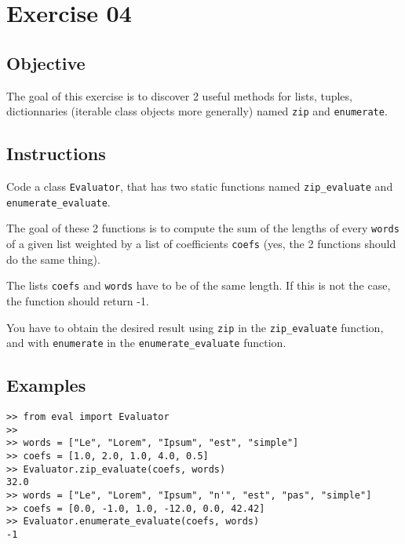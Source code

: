 \chapter{Exercise 04}
\makeheaderfilesforbidden


\section*{Objective}
The goal of this exercise is to discover 2 useful methods for lists, tuples,
dictionnaries (iterable class objects more generally) named \texttt{zip}
and \texttt{enumerate}.

\section*{Instructions}
Code a class \texttt{Evaluator}, that has two static functions named \texttt{zip\_evaluate}
and \texttt{enumerate\_evaluate}.


The goal of these 2 functions is to compute the sum of the lengths of every
\texttt{words} of a given list weighted by a list of coefficients \texttt{coefs} (yes, the 2 functions should do the same thing).

The lists \texttt{coefs} and \texttt{words} have to be of the same length. If this is not the
case, the function should return -1.

You have to obtain the desired result using \texttt{zip} in the \texttt{zip\_evaluate} function,
and with \texttt{enumerate} in the \texttt{enumerate\_evaluate} function.

\section*{Examples}
\begin{verbatim}
>> from eval import Evaluator
>> 
>> words = ["Le", "Lorem", "Ipsum", "est", "simple"]
>> coefs = [1.0, 2.0, 1.0, 4.0, 0.5]
>> Evaluator.zip_evaluate(coefs, words)
32.0
>> words = ["Le", "Lorem", "Ipsum", "n'", "est", "pas", "simple"]
>> coefs = [0.0, -1.0, 1.0, -12.0, 0.0, 42.42]
>> Evaluator.enumerate_evaluate(coefs, words)
-1
\end{verbatim}

